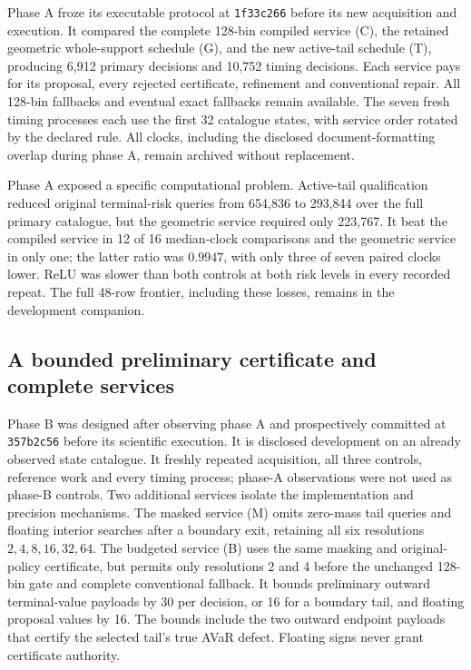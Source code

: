 Phase A froze its executable protocol at \texttt{1f33c266} before its new
acquisition and execution.  It compared the complete 128-bin compiled
service (C), the retained geometric whole-support schedule (G), and the
new active-tail schedule (T), producing 6,912 primary decisions and 10,752
timing decisions.  Each service pays for its proposal, every rejected
certificate, refinement and conventional repair.  All 128-bin fallbacks
and eventual exact fallbacks remain available.  The seven fresh timing
processes each use the first 32 catalogue states, with service order
rotated by the declared rule.  All clocks, including the disclosed
document-formatting overlap during phase A, remain archived without
replacement.

Phase A exposed a specific computational problem.  Active-tail qualification
reduced original terminal-risk queries from 654,836 to 293,844 over the
full primary catalogue, but the geometric service required only 223,767.
It beat the compiled service in 12 of 16 median-clock comparisons and the
geometric service in only one; the latter ratio was $0.9947$, with only
three of seven paired clocks lower.  ReLU was slower than both controls
at both risk levels in every recorded repeat.  The full 48-row frontier,
including these losses, remains in the development companion.

\subsection{A bounded preliminary certificate and complete services}
Phase B was designed after observing phase A and prospectively committed
at \texttt{357b2c56} before its scientific execution.  It is disclosed
development on an already observed state catalogue.  It freshly repeated
acquisition, all three controls, reference work and every timing process;
phase-A observations were not used as phase-B controls.  Two additional
services isolate the implementation and precision mechanisms.  The masked
service (M) omits zero-mass tail queries and floating interior searches
after a boundary exit, retaining all six resolutions $2,4,8,16,32,64$.
The budgeted service (B) uses the same masking and original-policy
certificate, but permits only resolutions 2 and 4 before the unchanged
128-bin gate and complete conventional fallback.  It bounds preliminary
outward terminal-value payloads by 30 per decision, or 16 for a boundary
tail, and floating proposal values by 16.  The bounds include the two
outward endpoint payloads that certify the selected tail's true AVaR
defect.  Floating signs never grant certificate authority.

